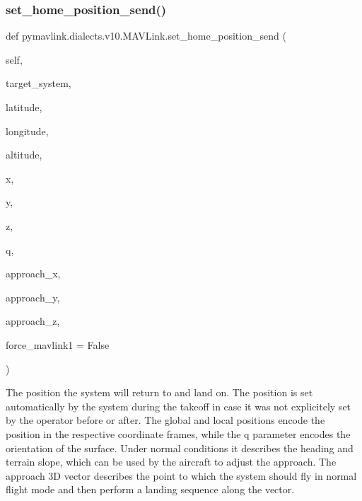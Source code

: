 \begin{DoxyVerb}
\begin{DoxyVerb}
\begin{DoxyVerb}
\begin{DoxyVerb}
\begin{DoxyVerb}
\begin{DoxyVerb}
\begin{DoxyVerb}
\begin{DoxyVerb}
\begin{DoxyVerb}
\begin{DoxyVerb}
\subsubsection{\texorpdfstring{set\+\_\+home\+\_\+position\+\_\+send()}{set\_home\_position\_send()}}
{\footnotesize\ttfamily def pymavlink.\+dialects.\+v10.\+M\+A\+V\+Link.\+set\+\_\+home\+\_\+position\+\_\+send (\begin{DoxyParamCaption}\item[{}]{self,  }\item[{}]{target\+\_\+system,  }\item[{}]{latitude,  }\item[{}]{longitude,  }\item[{}]{altitude,  }\item[{}]{x,  }\item[{}]{y,  }\item[{}]{z,  }\item[{}]{q,  }\item[{}]{approach\+\_\+x,  }\item[{}]{approach\+\_\+y,  }\item[{}]{approach\+\_\+z,  }\item[{}]{force\+\_\+mavlink1 = {\ttfamily False} }\end{DoxyParamCaption})}

\begin{DoxyVerb}The position the system will return to and land on. The position is
set automatically by the system during the takeoff in
case it was not explicitely set by the operator before
or after. The global and local positions encode the
position in the respective coordinate frames, while
the q parameter encodes the orientation of the
surface. Under normal conditions it describes the
heading and terrain slope, which can be used by the
aircraft to adjust the approach. The approach 3D
vector describes the point to which the system should
fly in normal flight mode and then perform a landing
sequence along the vector.


\end{DoxyVerb}
\end{DoxyVerb}
\end{DoxyVerb}
\end{DoxyVerb}
\end{DoxyVerb}
\end{DoxyVerb}
\end{DoxyVerb}
\end{DoxyVerb}
\end{DoxyVerb}
\end{DoxyVerb}
\end{DoxyVerb}
